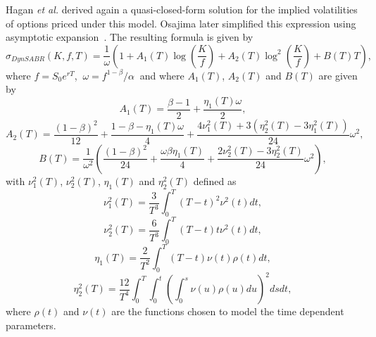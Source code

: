 Hagan \textit{et al.} derived again a quasi-closed-form solution for the implied volatilities of options priced under this model. Osajima later simplified this expression using asymptotic expansion~\citep{Osajima}. The resulting formula is given by
\begin{equation}\label{dynsabr}
\sigma_{DynSABR}(K,f,T)=\frac{1}{\omega}\left(1+A_1(T)\log\left(\frac{K}{f}\right)+A_2(T)\log^2\left(\frac{K}{f}\right)+B(T)T\right),
\end{equation}
\noindent where $f=S_0e^{rT}$, $\ \omega=f^{1-\beta}/\alpha\ $ and where $A_1(T)$, $A_2(T)$ and $B(T)$ are given by
\begin{equation}
A_1(T)=\frac{\beta-1}{2}+\frac{\eta_1(T)\omega}{2},
\end{equation}
\begin{equation}
A_2(T)=\frac{(1-\beta)^2}{12}+\frac{1-\beta-\eta_1(T)\omega}{4}+\frac{4\nu_1^2(T)+3(\eta_2^2(T)-3\eta_1^2(T))}{24}\omega^2,
\end{equation}
\begin{equation}
B(T)=\frac{1}{\omega^2}\left(\frac{(1-\beta)^2}{24}+\frac{\omega\beta\eta_1(T)}{4}+\frac{2\nu_2^2(T)-3\eta_2^2(T)}{24}\omega^2\right),
\end{equation}
\noindent with $\nu_1^2(T)$, $\nu_2^2(T)$, $\eta_1(T)$ and $\eta_2^2(T)$ defined as
\begin{equation}\label{nu1}
\nu_1^2(T)=\frac{3}{T^3}\int_0^T(T-t)^2\nu^2(t)dt,
\end{equation}
\begin{equation}
\nu_2^2(T)=\frac{6}{T^3}\int_0^T(T-t)t\nu^2(t)dt,
\end{equation}
\begin{equation}
\eta_1(T)=\frac{2}{T^2}\int_0^T(T-t)\nu(t)\rho(t)dt,
\end{equation}
\begin{equation}\label{eta2}
\eta_2^2(T)=\frac{12}{T^4}\int_0^T\int_0^t\left(\int_0^s\nu(u)\rho(u)du\right)^2dsdt,
\end{equation}
\noindent where $\rho(t)$ and $\nu(t)$ are the functions chosen to model the time dependent parameters.



